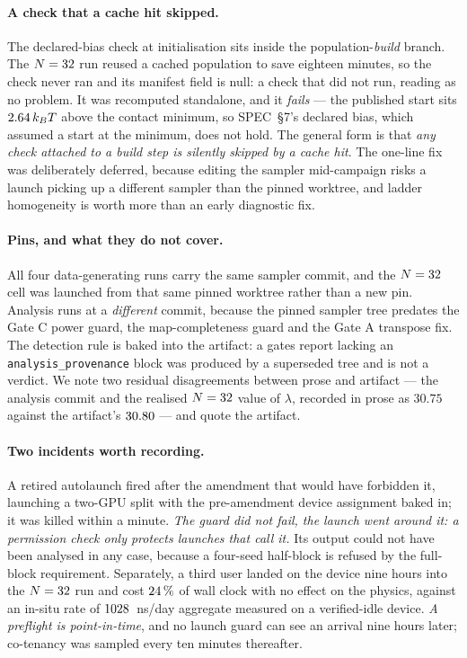 \paragraph*{A check that a cache hit skipped.} The declared-bias check at initialisation sits
inside the population-\emph{build} branch. The $N = 32$ run reused a cached population to
save eighteen minutes, so the check never ran and its manifest field is null: a check that did
not run, reading as no problem. It was recomputed standalone, and it \emph{fails} --- the
published start sits $2.64\,k_BT$ above the contact minimum, so SPEC~\S7's declared
bias, which assumed a start at the minimum, does not hold. The general form is that
\emph{any check attached to a build step is silently skipped by a cache hit}. The one-line fix
was deliberately deferred, because editing the sampler mid-campaign risks a launch picking up a
different sampler than the pinned worktree, and ladder homogeneity is worth more than an early
diagnostic fix.

\paragraph*{Pins, and what they do not cover.} All four data-generating runs carry the same
sampler commit, and the $N = 32$ cell was launched from that same pinned worktree rather than
a new pin. Analysis runs at a \emph{different} commit, because the pinned sampler tree predates
the Gate C power guard, the map-completeness guard and the Gate A transpose fix. The detection
rule is baked into the artifact: a gates report lacking an \texttt{analysis\_provenance} block was
produced by a superseded tree and is not a verdict. We note two residual disagreements between
prose and artifact --- the analysis commit and the realised $N = 32$ value of $\lambda$,
recorded in prose as $30.75$ against the artifact's $30.80$ --- and quote the artifact.

\paragraph*{Two incidents worth recording.} A retired autolaunch fired after the amendment that
would have forbidden it, launching a two-GPU split with the pre-amendment device assignment baked
in; it was killed within a minute. \emph{The guard did not fail, the launch went around it: a
permission check only protects launches that call it.} Its output could not have been analysed
in any case, because a four-seed half-block is refused by the full-block requirement. Separately,
a third user landed on the device nine hours into the $N = 32$ run and cost $24\,\%$
of wall clock with no effect on the physics, against an in-situ rate of $1028$~ns/day
aggregate measured on a verified-idle device. \emph{A preflight is point-in-time}, and no launch
guard can see an arrival nine hours later; co-tenancy was sampled every ten minutes thereafter.

